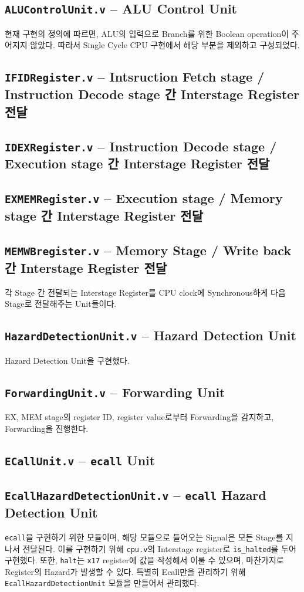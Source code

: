\documentclass{scrartcl}
\begin{document}
\subsection{\texttt{ALUControlUnit.v} -- ALU Control Unit}
현재 구현의 정의에 따르면, ALU의 입력으로 Branch를 위한 Boolean operation이 주어지지 않았다. 따라서 Single Cycle CPU 구현에서 해당 부분을 제외하고 구성되었다.

\subsection{\texttt{IFIDRegister.v} -- Intsruction Fetch stage / Instruction Decode stage 간 Interstage Register 전달}
\subsection{\texttt{IDEXRegister.v} -- Instruction Decode stage  / Execution stage 간 Interstage Register 전달}
\subsection{\texttt{EXMEMRegister.v} -- Execution stage / Memory stage 간 Interstage Register 전달}
\subsection{\texttt{MEMWBregister.v} -- Memory Stage / Write back 간 Interstage Register 전달}
각 Stage 간 전달되는 Interstage Register를 CPU clock에 Synchronous하게 다음 Stage로 전달해주는 Unit들이다.

\subsection{\texttt{HazardDetectionUnit.v} -- Hazard Detection Unit}
Hazard Detection Unit을 구현했다.

\subsection{\texttt{ForwardingUnit.v} -- Forwarding Unit}
EX, MEM stage의 register ID, register value로부터 Forwarding을 감지하고, Forwarding을 진행한다.

\subsection{\texttt{ECallUnit.v} -- \texttt{ecall} Unit}
\subsection{\texttt{EcallHazardDetectionUnit.v} -- \texttt{ecall} Hazard Detection Unit}
\texttt{ecall}을 구현하기 위한 모듈이며, 해당 모듈으로 들어오는 Signal은 모든 Stage를 지나서 전달된다. 이를 구현하기 위해 \texttt{cpu.v}의 Interstage register로 \texttt{is\_halted}를 두어 구현했다.
또한, \texttt{halt}는 \texttt{x17} register에 값을 작성해서 이룰 수 있으며, 마찬가지로 Register의 Hazard가 발생할 수 있다. 특별히 Ecall만을 관리하기 위해 \texttt{EcallHazardDetectionUnit} 모듈을 만들어서 관리했다.
\end{document}
